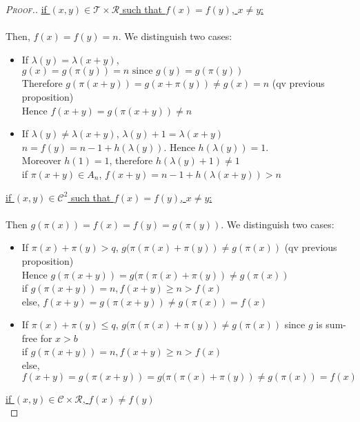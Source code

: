 \begin{proof}[\textsc{Proof.}]
\underline{if \((x,y) \in \mathcal{T} \times \mathcal{R}\) such that \(f(x)=f(y)\), \(x \neq y\):}\\
\\Then, \(f(x)=f(y)=n\). We distinguish two cases:


\begin{itemize}
\item If \(\lambda(y)=\lambda(x+y)\),
\\\(g(x)=g(\pi(y))=n \text{ since } g(y)=g(\pi(y))\)
\\Therefore \(g(\pi(x+y))=g(x+\pi(y)) \neq g(x)=n\) (qv previous proposition)
\\Hence \(f(x+y)=g(\pi(x+y))\neq n\)
\item If  \(\lambda(y)\neq \lambda(x+y)\), \(\lambda(y)+1= \lambda(x+y)\)\\
\(n=f(y)=n-1+h(\lambda(y))\). Hence \(h(\lambda(y))=1\).
\\Moreover \(h(1)=1\), therefore \(h(\lambda(y)+1) \neq 1\)
\\if \(\pi(x+y) \in A_n\), \(f(x+y)=n-1+h(\lambda(x+y))>n\)
\end{itemize}

\underline{if \((x,y) \in \mathcal{C}^2\) such that \(f(x)=f(y)\), \(x \neq y\):}\\
\\Then  \(g(\pi(x))=f(x)=f(y)=g(\pi(y))\). We distinguish two cases:

\begin{itemize}
\item If \(\pi(x)+\pi(y)>q\), \(g(\pi(\pi(x)+\pi(y)) \neq g(\pi(x))\) (qv previous proposition)
\\Hence \(g(\pi(x+y))= g(\pi(\pi(x)+\pi(y))\neq g(\pi(x))\)
\\if \(g(\pi(x+y))=n, f(x+y)\geqslant n > f(x)\)
\\else, \(f(x+y)=g(\pi(x+y))\neq g(\pi(x))=f(x)\)
\item If  \(\pi(x)+\pi(y)\leqslant q\), \(g(\pi(\pi(x)+\pi(y)) \neq g(\pi(x))\) since \(g\) is sum-free for \(x>b\)
\\if \(g(\pi(x+y))=n, f(x+y)\geqslant n > f(x)\)
\\else, \(f(x+y)=g(\pi(x+y))=g(\pi(\pi(x)+\pi(y))\neq g(\pi(x))=f(x)\)
\end{itemize}



\underline{if \((x,y) \in \mathcal{C} \times \mathcal{R} \), \(f(x)\neq f(y)\)}\\


\end{proof}
